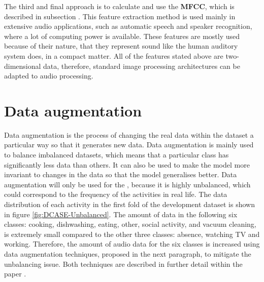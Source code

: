 \newline
\newline
The third and final approach is to calculate and use the \textbf{\gls{MFCC}}, which is described in subsection . This feature extraction method is used mainly in extensive audio applications, such as automatic speech and speaker recognition, where a lot of computing power is available. These features are mostly used because of their nature, that they represent sound like the human auditory system does, in a compact matter.
\newline
\newline
All of the features stated above are two-dimensional data, therefore, standard image processing architectures can be adapted to audio processing.

\section{Data augmentation}
\label{sec:Data-Augmentation}
Data augmentation is the process of changing the real data within the dataset a particular way so that it generates new data. Data augmentation is mainly used to balance imbalanced datasets, which means that a particular class has significantly less data than others. It can also be used to make the model more invariant to changes in the data so that the model generalises better.
\newline
\newline
Data augmentation will only be used for the , because it is highly unbalanced, which could correspond to the frequency of the activities in real life. The data distribution of each activity in the first fold of the development dataset is shown in figure \ref{fig:DCASE-Unbalanced}. The amount of data in the following six classes: cooking, dishwashing, eating, other, social activity, and vacuum cleaning, is extremely small compared to the other three classes: absence, watching TV and working. Therefore, the amount of audio data for the six classes is increased using data augmentation techniques, proposed in the next paragraph, to mitigate the unbalancing issue. Both techniques are described in further detail within the paper \cite{inoue_domestic_2018}.
